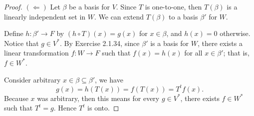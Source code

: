 \begin{Exercise}
\begin{enumerate}[(a)]
\begin{proof}
\vspace{2ex}

$(\Longleftarrow)$
Let $\beta$ be a basis for $V$. Since $T$ is one-to-one, then $T(\beta)$ is a linearly independent set in $W$. We can extend $T(\beta)$ to a basis $\beta'$ for $W$.

Define $h:\beta'\to F$ by $(h\circ T)(x) = g(x)$ for $x\in \beta$, and $h(x) = 0$ otherwise. Notice that $g\in V^*$. 
By Exercise 2.1.34, since $\beta'$ is a basis for $W$, there exists a linear transformation $f:W\to F$ such that $f(x)=h(x)$ for all $x\in \beta'$; that is, $f\in W^*$.

Consider arbitrary $x\in\beta\subseteq\beta'$, we have
$$
g(x) = h(T(x)) = f(T(x)) = T^t f(x).
$$
Because $x$ was arbitrary, then this means for every $g\in V^*$, there exists $f\in W^*$ such that $T^t = g$. Hence $T^t$ is onto.
\end{proof}
\end{enumerate}
\end{Exercise}